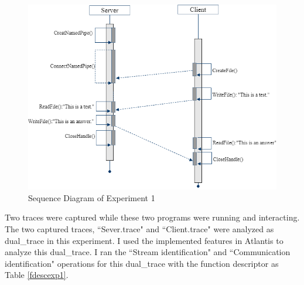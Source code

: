 \begin{figure}[H]
\centerline{\includegraphics[scale=0.7]{Figures/exp1}}
 \caption{Sequence Diagram of Experiment 1}
\label{exp1}
\end{figure}

Two traces were captured while these two programs were running and interacting. The two captured traces, ``Sever.trace" and ``Client.trace" were analyzed as dual\_trace in this experiment. I used the implemented features in Atlantis to analyze this dual\_trace. I ran the ``Stream identification" and ``Communication identification" operations for this dual\_trace with the function descriptor as Table \ref{fdescexp1}. 

